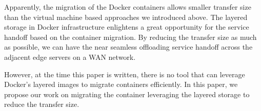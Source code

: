 Apparently, the migration of the Docker containers allows smaller transfer size than the virtual machine based approaches we introduced above. The layered storage in Docker infrastructure enlightens a great opportunity for the service handoff based on the container migration. By reducing the transfer size as much as possible, we can have the near seamless offloading service handoff across the adjacent edge servers on a WAN network.

However, at the time this paper is written, there is no tool that can leverage Docker's layered images to migrate containers efficiently. In this paper, we propose our work on migrating the container leveraging the layered storage to reduce the transfer size.
